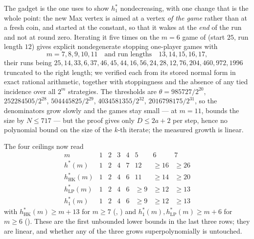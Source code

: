\begin{remark}\label{hkd:rem-one-plus-one}
The gadget is the one  uses to show $h^{\ast}_1$
nondecreasing, with one change that is the whole point: the new Max vertex
is aimed at a vertex \emph{of the game} rather than at a fresh coin, and
started at the constant, so that it wakes at the \emph{end} of the run and
not at round zero. Iterating it five times on the $m=6$ game of
 (start $25$, run length $12$) gives explicit
nondegenerate stopping one-player games with
\[
  m=7,8,9,10,11 \quad\text{and run lengths}\quad 13,14,15,16,17,
\]
their runs being $25,14,33,6,37,46,45,44,16,56,24,28,12,76,204,460,972,
1996$ truncated to the right length; we verified each from its stored
normal form in exact rational arithmetic, together with stoppingness and
the absence of any tied incidence over all $2^{m}$ strategies. The
thresholds are $\theta=985727/2^{20}$, $252284505/2^{28}$,
$504445825/2^{29}$, $4034581355/2^{32}$, $2016798175/2^{31}$, so the
denominators grow slowly and the games stay small --- at $m=11$,
 bounds the size by $N\le717$ --- but the proof gives
only $D\le2a+2$ per step, hence no polynomial bound on the size of the
$k$-th iterate; the measured growth is linear.
\end{remark}

The four ceilings now read
\[
\begin{array}{l|ccccccc}
m & 1 & 2 & 3 & 4 & 5 & 6 & 7\\ \hline
h^{\ast}(m) & 1 & 2 & 4 & 7 & 12 & \ge16 & \ge26\\
h^{\ast}_{\mathrm{HK}}(m) & 1 & 2 & 4 & 6 & 11 & \ge14 & \ge20\\
h^{\ast}_{\mathrm{LP}}(m) & 1 & 2 & 4 & 6 & \ge9 & \ge12 & \ge13\\
h^{\ast}_{1}(m) & 1 & 2 & 4 & 6 & \ge9 & \ge12 & \ge13
\end{array}
\]
with $h^{\ast}_{\mathrm{HK}}(m)\ge m+13$ for $m\ge7$
(, ) and
$h^{\ast}_{1}(m),h^{\ast}_{\mathrm{LP}}(m)\ge m+6$ for $m\ge6$
(). These are the first unbounded lower bounds
in the last three rows; they are linear, and whether any of the three
grows superpolynomially is untouched.